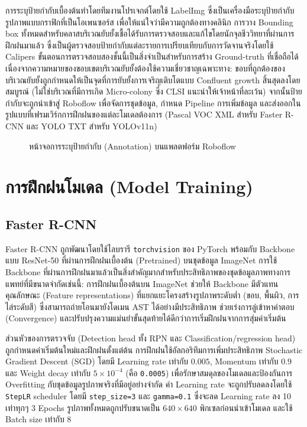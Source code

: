 การระบุป้ายกำกับเบื้องต้นทำโดยทีมงานโปรเจกต์โดยใช้ LabelImg \cite{labelimg} ซึ่งเป็นเครื่องมือระบุป้ายกำกับรูปภาพแบบกราฟิกที่เป็นโอเพนซอร์ส เพื่อให้แน่ใจว่ามีความถูกต้องทางคลินิก การวาง Bounding box ทั้งหมดสำหรับคลาสบริเวณยับยั้งเชื้อได้รับการตรวจสอบและแก้ไขโดยนักจุลชีววิทยาที่ผ่านการฝึกฝนมาแล้ว ซึ่งเป็นผู้ตรวจสอบป้ายกำกับแต่ละรายการเปรียบเทียบกับการวัดจานจริงโดยใช้ Calipers ขั้นตอนการตรวจสอบสองชั้นนี้เป็นสิ่งจำเป็นสำหรับการสร้าง Ground-truth ที่เชื่อถือได้ เนื่องจากความหมายของขอบเขตบริเวณยับยั้งต้องใช้ความเชี่ยวชาญเฉพาะทาง: ขอบที่ถูกต้องของบริเวณยับยั้งถูกกำหนดให้เป็นจุดที่การยับยั้งการเจริญเติบโตแบบ Confluent growth สิ้นสุดลงโดยสมบูรณ์ (ไม่ใช่บริเวณที่มีการเกิด Micro-colony ซึ่ง CLSI แนะนำให้เจ้าหน้าที่ละเว้น) จากนั้นป้ายกำกับจะถูกนำเข้าสู่ Roboflow เพื่อจัดการชุดข้อมูล, กำหนด Pipeline การเพิ่มข้อมูล และส่งออกในรูปแบบที่เฟรมเวิร์กการฝึกฝนของแต่ละโมเดลต้องการ (Pascal VOC XML สำหรับ Faster R-CNN และ YOLO TXT สำหรับ YOLOv11n)

\begin{figure}[H]
  \centering
  \caption{หน้าจอการระบุป้ายกำกับ (Annotation) บนแพลตฟอร์ม Roboflow}
  \label{fig:annotation}
\end{figure}

\section{การฝึกฝนโมเดล (Model Training)}

\subsection{Faster R-CNN}

Faster R-CNN ถูกพัฒนาโดยใช้ไลบรารี \texttt{torchvision} ของ PyTorch พร้อมกับ Backbone แบบ ResNet-50 ที่ผ่านการฝึกฝนเบื้องต้น (Pretrained) บนชุดข้อมูล ImageNet \cite{he2016deep} การใช้ Backbone ที่ผ่านการฝึกฝนมาแล้วเป็นสิ่งสำคัญมากสำหรับประสิทธิภาพของชุดข้อมูลภาพทางการแพทย์ที่มีขนาดจำกัดเช่นนี้: การฝึกฝนเบื้องต้นบน ImageNet ช่วยให้ Backbone มีตัวแทนคุณลักษณะ (Feature representations) ที่แยกแยะโครงสร้างรูปภาพระดับต่ำ (ขอบ, พื้นผิว, การไล่ระดับสี) ซึ่งสามารถถ่ายโอนมายังโดเมน AST ได้อย่างมีประสิทธิภาพ ช่วยเร่งการลู่เข้าหาคำตอบ (Convergence) และปรับปรุงความแม่นยำขั้นสุดท้ายได้ดีกว่าการเริ่มฝึกฝนจากการสุ่มค่าเริ่มต้น

ส่วนหัวของการตรวจจับ (Detection head ทั้ง RPN และ Classification/regression head) ถูกกำหนดค่าเริ่มต้นใหม่และฝึกฝนตั้งแต่ต้น การฝึกฝนใช้อัลกอริทึมการเพิ่มประสิทธิภาพ Stochastic Gradient Descent (SGD) โดยมี Learning rate เท่ากับ $0.005$, Momentum เท่ากับ $0.9$ และ Weight decay เท่ากับ $5 \times 10^{-4}$ (คือ \texttt{0.0005}) เพื่อรักษาสมดุลของโมเดลและป้องกันการ Overfitting กับชุดข้อมูลรูปภาพจริงที่มีอยู่อย่างจำกัด ค่า Learning rate จะถูกปรับลดลงโดยใช้ \texttt{StepLR} scheduler โดยมี \texttt{step\_size=3} และ \texttt{gamma=0.1} ซึ่งจะลด Learning rate ลง 10 เท่าทุกๆ 3 Epochs รูปภาพทั้งหมดถูกปรับขนาดเป็น $640 \times 640$ พิกเซลก่อนนำเข้าโมเดล และใช้ Batch size เท่ากับ 8


